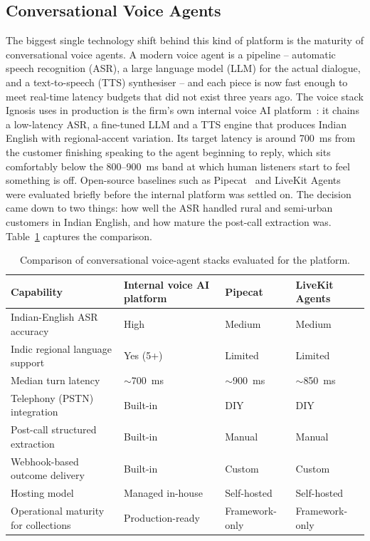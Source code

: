 \subsection{Conversational Voice Agents}
The biggest single technology shift behind this kind of platform is the maturity of conversational voice agents. A modern voice agent is a pipeline -- automatic speech recognition (ASR), a large language model (LLM) for the actual dialogue, and a text-to-speech (TTS) synthesiser -- and each piece is now fast enough to meet real-time latency budgets that did not exist three years ago. The voice stack Ignosis uses in production is the firm's own internal voice AI platform~\cite{bolna}: it chains a low-latency ASR, a fine-tuned LLM and a TTS engine that produces Indian English with regional-accent variation. Its target latency is around 700~ms from the customer finishing speaking to the agent beginning to reply, which sits comfortably below the 800--900~ms band at which human listeners start to feel something is off. Open-source baselines such as Pipecat~\cite{pipecat} and LiveKit Agents~\cite{livekit} were evaluated briefly before the internal platform was settled on. The decision came down to two things: how well the ASR handled rural and semi-urban customers in Indian English, and how mature the post-call extraction was. Table~\ref{tab:voice-agents} captures the comparison.

\begin{table}[H]
\centering
\caption{Comparison of conversational voice-agent stacks evaluated for the platform.}
\label{tab:voice-agents}
\small
\setlength{\tabcolsep}{4pt}
\begin{tabularx}{\textwidth}{@{}>{\raggedright\arraybackslash}p{} >{\centering\arraybackslash}X >{\centering\arraybackslash}X >{\centering\arraybackslash}X@{}}
\toprule
\textbf{Capability} & \textbf{Internal voice AI platform} & \textbf{Pipecat} & \textbf{LiveKit Agents} \\
\midrule
Indian-English ASR accuracy            & High             & Medium         & Medium \\
Indic regional language support        & Yes (5+)         & Limited        & Limited \\
Median turn latency                    & $\sim$700~ms     & $\sim$900~ms   & $\sim$850~ms \\
Telephony (PSTN) integration           & Built-in         & DIY            & DIY \\
Post-call structured extraction        & Built-in         & Manual         & Manual \\
Webhook-based outcome delivery         & Built-in         & Custom         & Custom \\
Hosting model                          & Managed in-house & Self-hosted    & Self-hosted \\
Operational maturity for collections   & Production-ready & Framework-only & Framework-only \\
\bottomrule
\end{tabularx}
\end{table}

